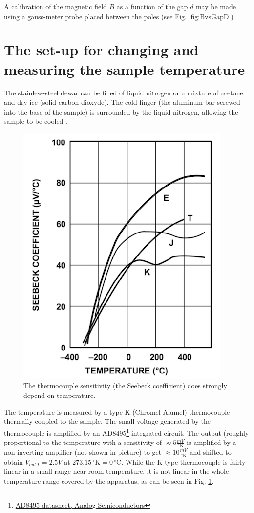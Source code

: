 \documentclass[]{book}
\let\rmarkdownfootnote\footnote%
\def\footnote{\protect\rmarkdownfootnote}
\begin{document}
A calibration of the magnetic field \(B\) as a function of the gap \(d\)
may be made using a gauss-meter probe placed between the poles (see Fig.
\ref{fig:BvsGapD})

\section{The set-up for changing and measuring the sample
temperature}\label{the-set-up-for-changing-and-measuring-the-sample-temperature}

The stainless-steel dewar can be filled of liquid nitrogen or a mixture
of acetone and dry-ice (solid carbon dioxyde). The cold finger (the
aluminum bar screwed into the base of the sample) is surrounded by the
liquid nitrogen, allowing the sample to be cooled .

\begin{figure}

{\centering \includegraphics[width=0.3\linewidth]{Assets/Figures/seebeck_coefficient_vs_temperature} 

}

\caption{The thermocouple sensitivity (the Seebeck coefficient) does strongly depend on temperature.}\label{fig:seebeckNonlinearity}
\end{figure}

The temperature is measured by a type K (Chromel-Alumel) thermocouple
thermally coupled to the sample. The small voltage generated by the
thermocouple is amplified by an AD8495\footnote{\href{http://www.analog.com/en/products/amplifiers/specialty-amplifiers/thermocouple-interface-amplifiers/AD8495.html}{AD8495
  datasheet, Analog Semiconductors}} integrated circuit. The output
(roughly proportional to the temperature with a sensitivity of
\(\approx 5\frac { mV }{ \,^{\circ}\mathrm{K} }\) is amplified by a
non-inverting amplifier (not shown in picture) to get
\(\approx 10\frac { mV }{ \,^{\circ}\mathrm{K} }\) and shifted to obtain
\(V_{out \, T}=2.5V\) at
\(273.15\,^{\circ}\mathrm{K}=0\,^{\circ}\mathrm{C}\). While the K type
thermocouple is fairly linear in a small range near room temperature, it
is not linear in the whole temperature range covered by the apparatus,
as can be seen in Fig. \ref{fig:seebeckNonlinearity}.
\end{document}
